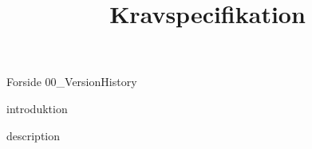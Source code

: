 \documentclass[a4paper,openany]{memoir}
\title{Kravspecifikation}
\begin{document}
	{Forside}  \newpage
	\tableofcontents\thispagestyle{fancy}
	{00_VersionHistory}  \newpage

	{introduktion}

	{description}  \newpage

	 {}
	\printbibliography
\end{document}

